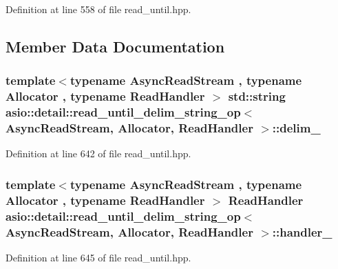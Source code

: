 Definition at line 558 of file read\+\_\+until.\+hpp.



\subsection{Member Data Documentation}
\hypertarget{classasio_1_1detail_1_1read__until__delim__string__op_a24e5eb26f7b7fcb147e690b659acc2f5}{}
\subsubsection[{delim\+\_\+}]{\setlength{\rightskip}{0pt plus 5cm}template$<$typename Async\+Read\+Stream , typename Allocator , typename Read\+Handler $>$ std\+::string {\bf asio\+::detail\+::read\+\_\+until\+\_\+delim\+\_\+string\+\_\+op}$<$ Async\+Read\+Stream, Allocator, Read\+Handler $>$\+::delim\+\_\+}\label{classasio_1_1detail_1_1read__until__delim__string__op_a24e5eb26f7b7fcb147e690b659acc2f5}


Definition at line 642 of file read\+\_\+until.\+hpp.

\hypertarget{classasio_1_1detail_1_1read__until__delim__string__op_ac2a5d6356c57ee87c7a0b21fc50dee8f}{}
\subsubsection[{handler\+\_\+}]{\setlength{\rightskip}{0pt plus 5cm}template$<$typename Async\+Read\+Stream , typename Allocator , typename Read\+Handler $>$ Read\+Handler {\bf asio\+::detail\+::read\+\_\+until\+\_\+delim\+\_\+string\+\_\+op}$<$ Async\+Read\+Stream, Allocator, Read\+Handler $>$\+::handler\+\_\+}\label{classasio_1_1detail_1_1read__until__delim__string__op_ac2a5d6356c57ee87c7a0b21fc50dee8f}


Definition at line 645 of file read\+\_\+until.\+hpp.

